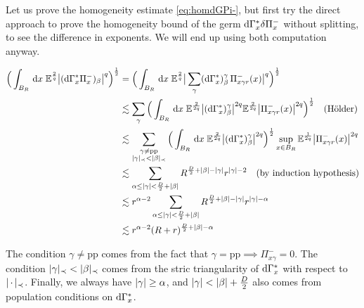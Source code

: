 Let us prove the homogeneity estimate \eqref{eq:homdGPi-}, but first try the direct approach to prove the homogeneity bound of the germ $\mathrm{d}\Gamma^*_x \delta \Pi^-_x$ without splitting, to see the difference in exponents.
We will end up using both computation anyway.

\begin{align*}
    \Big(\int_{B_R} \,\mathrm{d} x\; \mathbb{E}^{\frac{2}{q}}\big| (\mathrm{d}\Gamma^*_x \Pi^-_x)_\beta\big|^q\Big)^{\frac{1}{2}}
    &= \Big(\int_{B_R} \,\mathrm{d} x\; \mathbb{E}^{\frac{2}{q}}\big|\sum_{\gamma } (\mathrm{d}\Gamma^*_x)^\gamma_\beta\,\Pi^-_{x\gamma r}(x)\big|^q\Big)^{\frac{1}{2}} \\
    &\lesssim \sum_{\gamma } \Big(\int_{B_R} \,\mathrm{d} x\; \mathbb{E}^{\frac{2}{2q}}\big|(\mathrm{d}\Gamma^*_x)^\gamma_\beta\big|^{2q} \mathbb{E}^{\frac{2}{2q}}\big|\Pi^-_{x\gamma r}(x)\big|^{2q}\Big)^{\frac{1}{2}} \quad \text{(Hölder)}\\
    &\lesssim \sum_{\substack{\gamma \neq \text{pp} \\ \lvert\gamma\rvert_\prec < \lvert\beta\rvert_\prec}} \Big(\int_{B_R} \,\mathrm{d} x\; \mathbb{E}^{\frac{2}{2q}}\big|(\mathrm{d}\Gamma^*_x)^\gamma_\beta\big|^{2q}\Big)^{\frac{1}{2}} \sup_{x \in B_R} \mathbb{E}^{\frac{1}{2q}}\big|\Pi^-_{x\gamma r}(x)\big|^{2q} \\
    &\lesssim \sum_{\alpha \leq \lvert\gamma\rvert < \frac{D}{2}+\lvert\beta\rvert} R^{\frac{D}{2}+\lvert\beta\rvert - \lvert\gamma\rvert} r^{\lvert\gamma\rvert - 2} \quad \text{(by induction hypothesis)}\\  
    &\lesssim r^{\alpha - 2} \sum_{\alpha \leq \lvert\gamma\rvert < \frac{D}{2}+\lvert\beta\rvert} R^{\frac{D}{2}+\lvert\beta\rvert - \lvert\gamma\rvert} r^{\lvert\gamma\rvert - \alpha}\\
    &\lesssim r^{\alpha - 2} (R+r)^{\frac{D}{2}+\lvert\beta\rvert - \alpha} 
\end{align*}

The condition $\gamma \neq \text{pp}$ comes from the fact that $\gamma = \text{pp} \implies \Pi^-_{x\gamma} = 0$. The condition $\lvert\gamma\rvert_\prec < \lvert\beta\rvert_\prec$ comes from the stric triangularity of $\mathrm{d}\Gamma^*_x$ with respect to $\lvert\, \cdot \, \rvert_\prec$.
Finally, we always have $\lvert\gamma\rvert \geq \alpha$, and $\lvert\gamma\rvert< \lvert\beta\rvert + \frac{D}{2}$ also comes from population conditions on $\mathrm{d}\Gamma^*_x$.

